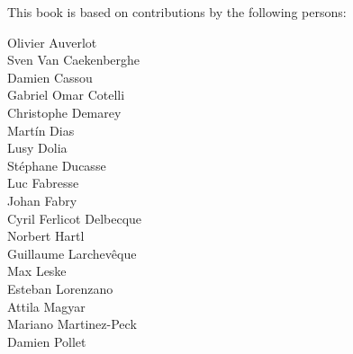 \documentclass[11pt,english]{../support/latex/sbabook/sbabook}
\begin{document}
\color{white}
\vspace{5\baselineskip}
This book is based on contributions by the following persons:

\small

\begin{multicols}{3}
Olivier Auverlot\\
Sven Van Caekenberghe\\
Damien Cassou\\
Gabriel Omar Cotelli\\
Christophe Demarey\\
Martín Dias\\
Lusy Dolia\\
Stéphane Ducasse\\
Luc Fabresse\\
Johan Fabry\\
Cyril Ferlicot Delbecque\\
Norbert Hartl\\
Guillaume Larchevêque\\
Max Leske\\
Esteban Lorenzano\\
Attila Magyar\\
Mariano Martinez-Peck\\
Damien Pollet\\
\end{multicols}
\end{document}
